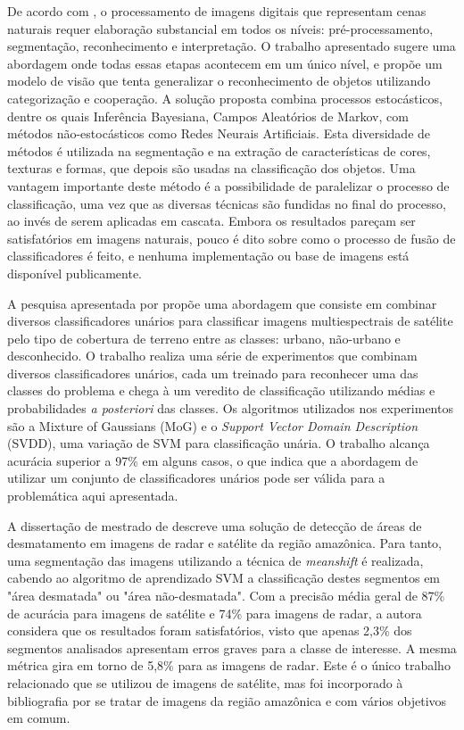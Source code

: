 De acordo com , o processamento de imagens digitais que representam cenas naturais requer elaboração substancial em todos os níveis: pré-processamento, segmentação, reconhecimento e interpretação. O trabalho apresentado sugere uma abordagem onde todas essas etapas acontecem em um único nível, e propõe um modelo de visão que tenta generalizar o reconhecimento de objetos utilizando categorização e cooperação.  A solução proposta combina processos estocásticos, dentre os quais Inferência Bayesiana, Campos Aleatórios de Markov, com métodos não-estocásticos como Redes Neurais Artificiais. Esta diversidade de métodos é utilizada na segmentação e na extração de características de cores, texturas e formas, que depois são usadas na classificação dos objetos. Uma vantagem importante deste método é a possibilidade de paralelizar o processo de classificação, uma vez que as diversas técnicas são fundidas no final do processo, ao invés de serem aplicadas em cascata. Embora os resultados pareçam ser satisfatórios em imagens naturais, pouco é dito sobre como o processo de fusão de classificadores é feito, e nenhuma implementação ou base de imagens está disponível publicamente.

A pesquisa apresentada por  propõe uma abordagem que consiste em combinar diversos classificadores unários para classificar imagens multiespectrais de satélite pelo tipo de cobertura de terreno entre as classes: urbano, não-urbano e desconhecido. O trabalho realiza uma série de experimentos que combinam diversos classificadores unários, cada um treinado para reconhecer uma das classes do problema e chega à um veredito de classificação utilizando médias e probabilidades \textit{a posteriori} das classes. Os algoritmos utilizados nos experimentos são a Mixture of Gaussians (MoG) e o \textit{Support Vector Domain Description} (SVDD), uma variação de SVM para classificação unária. O trabalho alcança acurácia superior a 97\% em alguns casos, o que indica que a abordagem de utilizar um conjunto de classificadores unários pode ser válida para a problemática aqui apresentada.

A dissertação de mestrado de  descreve uma solução de detecção de áreas de desmatamento em imagens de radar e satélite da região amazônica. Para tanto, uma segmentação das imagens utilizando a técnica de \textit{meanshift} é realizada, cabendo ao algoritmo de aprendizado SVM a classificação destes segmentos em "área desmatada" ou "área não-desmatada". Com a precisão média geral de 87\% de acurácia para imagens de satélite e 74\% para imagens de radar, a autora considera que os resultados foram satisfatórios, visto que apenas 2,3\% dos segmentos analisados apresentam erros graves para a classe de interesse. A mesma métrica gira em torno de 5,8\% para as imagens de radar. Este é o único trabalho relacionado que se utilizou de imagens de satélite, mas foi incorporado à bibliografia por se tratar de imagens da região amazônica e com vários objetivos em comum.

